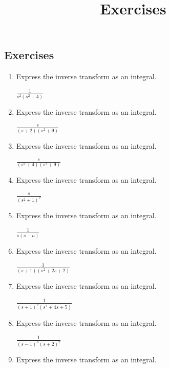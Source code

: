 \documentclass{ximera}
\title{Exercises} \license{CC BY-NC-SA 4.0}
\begin{document}
\begin{abstract}
\end{abstract}
\maketitle

\begin{onlineOnly}
\section*{Exercises}
\end{onlineOnly}

\begin{problem}\label{exer:8.6.1}

\begin{enumerate}

\item Express the inverse transform as an integral.  

$\frac{1}{s^2(s^2+4)}$

\item Express the inverse transform as an integral.

$\frac{s}{(s+2)(s^2+9)}$

\item Express the inverse transform as an integral.

$\frac{s}{(s^2+4)(s^2+9)}$

\item Express the inverse transform as an integral.

$\frac{s}{(s^2+1)^2}$

\item Express the inverse transform as an integral.

$\frac{1}{s(s-a)}$

\item Express the inverse transform as an integral.

$\frac{1}{(s+1)(s^2+2s+2)}$

\item Express the inverse transform as an integral.

$\frac{1}{(s+1)^2(s^2+4s+5)}$

\item Express the inverse transform as an integral.

$\frac{1}{(s-1)^3(s+2)^2}$

\item Express the inverse transform as an integral.


\end{enumerate}
\end{problem}
\end{document}
